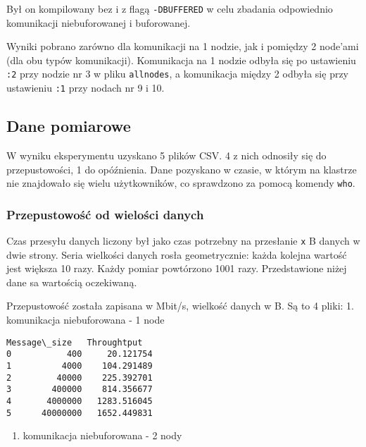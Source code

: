 \documentclass[11pt]{article}
\providecommand{\tightlist}{%
      \setlength{\itemsep}{0pt}\setlength{\parskip}{0pt}}
\begin{document}
Był on kompilowany bez i z flagą \texttt{-DBUFFERED} w celu zbadania
odpowiednio komunikacji niebuforowanej i buforowanej.

Wyniki pobrano zarówno dla komunikacji na 1 nodzie, jak i pomiędzy 2
node'ami (dla obu typów komunikacji). Komunikacja na 1 nodzie odbyła się
po ustawieniu \texttt{:2} przy nodzie nr 3 w pliku \texttt{allnodes}, a
komunikacja między 2 odbyła się przy ustawieniu \texttt{:1} przy nodach
nr 9 i 10.

    \hypertarget{dane-pomiarowe}{%
\subsection{Dane pomiarowe}\label{dane-pomiarowe}}

W wyniku eksperymentu uzyskano 5 plików CSV. 4 z nich odnosiły się do
przepustowości, 1 do opóźnienia. Dane pozyskano w czasie, w którym na
klastrze nie znajdowało się wielu użytkowników, co sprawdzono za pomocą
komendy \texttt{who}.

\hypertarget{przepustowoux15bux107-od-wieloux15bci-danych}{%
\subsubsection{Przepustowość od wielości
danych}\label{przepustowoux15bux107-od-wieloux15bci-danych}}

Czas przesyłu danych liczony był jako czas potrzebny na przesłanie
\texttt{x} B danych w dwie strony. Seria wielkości danych rosła
geometrycznie: każda kolejna wartość jest większa 10 razy. Każdy pomiar
powtórzono 1001 razy. Przedstawione niżej dane sa wartością oczekiwaną.

Przepustowość została zapisana w Mbit/s, wielkość danych w B. Są to 4
pliki: 1. komunikacja niebuforowana - 1 node

            \begin{tcolorbox}[breakable, size=fbox, boxrule=.5pt, pad at break*=1mm, opacityfill=0]
\begin{Verbatim}[commandchars=\\\{\}]
   Message\_size   Throughtput
0           400     20.121754
1          4000    104.291489
2         40000    225.392701
3        400000    814.356677
4       4000000   1283.516045
5      40000000   1652.449831
\end{Verbatim}
\end{tcolorbox}
        
    \begin{enumerate}
\def\labelenumi{\arabic{enumi}.}
\setcounter{enumi}{1}
\tightlist
\item
  komunikacja niebuforowana - 2 nody
\end{enumerate}
\end{document}
